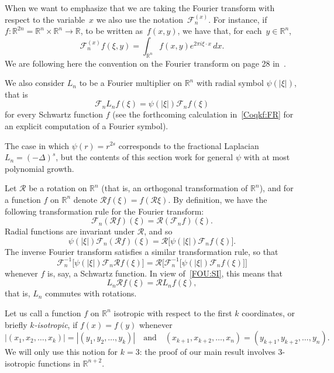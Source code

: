 \documentclass[a4paper,12pt,reqno]{amsart}
\numberwithin{equation}{section}
\theoremstyle{definition}
\theoremstyle{notation}
\newcommand{\fourier}{\mathscr{F}}
\newcommand{\R}{\mathds{R}}
\begin{document}
When we want to emphasize that we are taking the Fourier transform with respect to the variable~$x$
we also use the notation~$ \fourier_n^{(x)}$. For instance, if~$f:\R^{2n}=\R^n\times\R^n\to\R$, to be written as~$f(x,y)$, we have that, for each~$y\in\R^n$,
$$  \fourier_n^{(x)} f(\xi,y) = \int_{\R^n} f(x,y) e^{2\pi i \xi\cdot x} \,dx .$$
We are following here the
convention on the Fourier transform
on page 28 in~\cite{stein}.


We also consider $L_n$ to be a Fourier multiplier on $\R^n$ with radial symbol $\psi(|\xi|)$, that is
\begin{equation}\label{FOU:SI}
 \fourier_n L_n f(\xi)  = \psi(|\xi|) \fourier_n f(\xi)
\end{equation}
for every Schwartz function $f$
(see the forthcoming calculation in~\eqref{Coqkf:FR}
for an explicit computation of a Fourier symbol).


The case in which $\psi(r) = r^{2 s}$ corresponds to the fractional Laplacian $L_n = (-\Delta)^s$, but the contents of this section work for general $\psi$ with at most polynomial growth.


Let $\mathcal R$ be a rotation on $\R^n$ (that is, an orthogonal transformation of $\R^n$), and for a function $f$ on $\R^n$ denote $\mathcal R f(\xi) = f(\mathcal R \xi)$. By definition, we have the following transformation rule for the Fourier transform:
\[
 \fourier_n (\mathcal R f)(\xi) = \mathcal R (\fourier_n f)(\xi) .
\]
Radial functions are invariant under $\mathcal R$, and so
\[
 \psi(|\xi|) \fourier_n (\mathcal R f)(\xi) = \mathcal R \bigl[\psi(|\xi|) \fourier_n f(\xi)\bigr] .
\]
The inverse Fourier transform satisfies a similar transformation rule, so that
\[
 \fourier_n^{-1} \bigl[\psi(|\xi|) \fourier_n \mathcal R f(\xi)\bigr] = \mathcal R \bigl[ \fourier_n^{-1} \bigl[ \psi(|\xi|) \fourier_n f(\xi) \bigr]\bigr]
\]
whenever $f$ is, say, a Schwartz function. In view of~\eqref{FOU:SI}, this means that
\begin{equation}
\label{eq:commute}
 L_n \mathcal R f(\xi) = \mathcal R L_n f(\xi) ,
\end{equation}
that is, $L_n$ commutes with rotations.


Let us call a function $f$ on $\R^n$ isotropic with respect to the first $k$ coordinates, or briefly \emph{$k$-isotropic}, if $f(x) = f(y)$ whenever
\[
 |(x_1, x_2, \ldots, x_k)| = |(y_1, y_2, \ldots, y_k)| \quad \text{and} \quad (x_{k+1}, x_{k+2}, \ldots, x_n) = (y_{k+1}, y_{k+2}, \ldots, y_n) .
\]
We will only use this notion for $k = 3$: the proof of our main result involves $3$-isotropic functions in $\R^{n+2}$.
\end{document}
